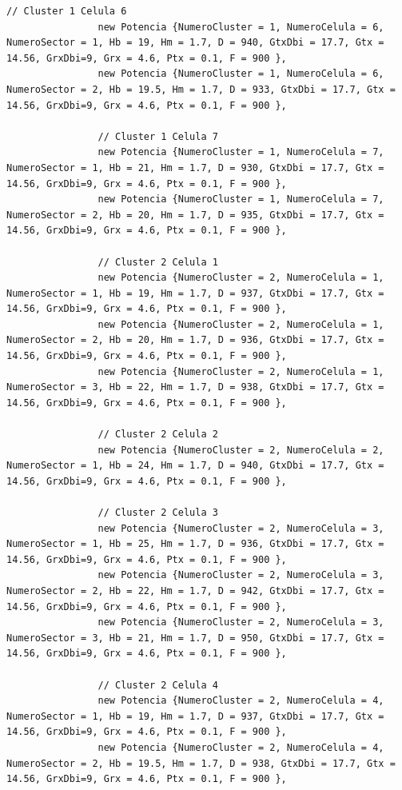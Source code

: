 \documentclass[11pt,letterpaper]{article}
\begin{document}
\begin{lstlisting}[style=CStyle]
                // Cluster 1 Celula 6
                new Potencia {NumeroCluster = 1, NumeroCelula = 6, NumeroSector = 1, Hb = 19, Hm = 1.7, D = 940, GtxDbi = 17.7, Gtx = 14.56, GrxDbi=9, Grx = 4.6, Ptx = 0.1, F = 900 },
                new Potencia {NumeroCluster = 1, NumeroCelula = 6, NumeroSector = 2, Hb = 19.5, Hm = 1.7, D = 933, GtxDbi = 17.7, Gtx = 14.56, GrxDbi=9, Grx = 4.6, Ptx = 0.1, F = 900 },

                // Cluster 1 Celula 7
                new Potencia {NumeroCluster = 1, NumeroCelula = 7, NumeroSector = 1, Hb = 21, Hm = 1.7, D = 930, GtxDbi = 17.7, Gtx = 14.56, GrxDbi=9, Grx = 4.6, Ptx = 0.1, F = 900 },
                new Potencia {NumeroCluster = 1, NumeroCelula = 7, NumeroSector = 2, Hb = 20, Hm = 1.7, D = 935, GtxDbi = 17.7, Gtx = 14.56, GrxDbi=9, Grx = 4.6, Ptx = 0.1, F = 900 },

                // Cluster 2 Celula 1
                new Potencia {NumeroCluster = 2, NumeroCelula = 1, NumeroSector = 1, Hb = 19, Hm = 1.7, D = 937, GtxDbi = 17.7, Gtx = 14.56, GrxDbi=9, Grx = 4.6, Ptx = 0.1, F = 900 },
                new Potencia {NumeroCluster = 2, NumeroCelula = 1, NumeroSector = 2, Hb = 20, Hm = 1.7, D = 936, GtxDbi = 17.7, Gtx = 14.56, GrxDbi=9, Grx = 4.6, Ptx = 0.1, F = 900 },
                new Potencia {NumeroCluster = 2, NumeroCelula = 1, NumeroSector = 3, Hb = 22, Hm = 1.7, D = 938, GtxDbi = 17.7, Gtx = 14.56, GrxDbi=9, Grx = 4.6, Ptx = 0.1, F = 900 },

                // Cluster 2 Celula 2
                new Potencia {NumeroCluster = 2, NumeroCelula = 2, NumeroSector = 1, Hb = 24, Hm = 1.7, D = 940, GtxDbi = 17.7, Gtx = 14.56, GrxDbi=9, Grx = 4.6, Ptx = 0.1, F = 900 },

                // Cluster 2 Celula 3
                new Potencia {NumeroCluster = 2, NumeroCelula = 3, NumeroSector = 1, Hb = 25, Hm = 1.7, D = 936, GtxDbi = 17.7, Gtx = 14.56, GrxDbi=9, Grx = 4.6, Ptx = 0.1, F = 900 },
                new Potencia {NumeroCluster = 2, NumeroCelula = 3, NumeroSector = 2, Hb = 22, Hm = 1.7, D = 942, GtxDbi = 17.7, Gtx = 14.56, GrxDbi=9, Grx = 4.6, Ptx = 0.1, F = 900 },
                new Potencia {NumeroCluster = 2, NumeroCelula = 3, NumeroSector = 3, Hb = 21, Hm = 1.7, D = 950, GtxDbi = 17.7, Gtx = 14.56, GrxDbi=9, Grx = 4.6, Ptx = 0.1, F = 900 },

                // Cluster 2 Celula 4
                new Potencia {NumeroCluster = 2, NumeroCelula = 4, NumeroSector = 1, Hb = 19, Hm = 1.7, D = 937, GtxDbi = 17.7, Gtx = 14.56, GrxDbi=9, Grx = 4.6, Ptx = 0.1, F = 900 },
                new Potencia {NumeroCluster = 2, NumeroCelula = 4, NumeroSector = 2, Hb = 19.5, Hm = 1.7, D = 938, GtxDbi = 17.7, Gtx = 14.56, GrxDbi=9, Grx = 4.6, Ptx = 0.1, F = 900 },


\end{lstlisting}
\end{document}
